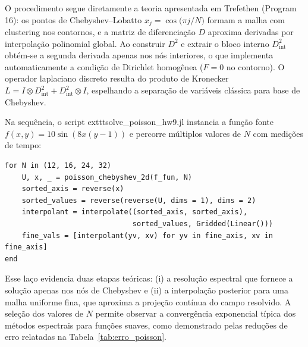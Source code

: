 O procedimento segue diretamente a teoria apresentada em Trefethen (Program 16): os pontos de Chebyshev--Lobatto $x_j = \cos\big(\pi j/N\big)$ formam a malha com clustering nos contornos, e a matriz de diferenciação $D$ aproxima derivadas por interpolação polinomial global. Ao construir $D^2$ e extrair o bloco interno $D_{\text{int}}^2$ obtém-se a segunda derivada apenas nos nós interiores, o que implementa automaticamente a condição de Dirichlet homogênea ($F=0$ no contorno). O operador laplaciano discreto resulta do produto de Kronecker $L = I \otimes D_{\text{int}}^2 + D_{\text{int}}^2 \otimes I$, espelhando a separação de variáveis clássica para base de Chebyshev.

Na sequência, o script 	exttt{solve\_poisson\_hw9.jl} instancia a função fonte $f(x,y) = 10\sin(8x(y-1))$ e percorre múltiplos valores de $N$ com medições de tempo:

\begin{verbatim}
for N in (12, 16, 24, 32)
    U, x, _ = poisson_chebyshev_2d(f_fun, N)
    sorted_axis = reverse(x)
    sorted_values = reverse(reverse(U, dims = 1), dims = 2)
    interpolant = interpolate((sorted_axis, sorted_axis),
                              sorted_values, Gridded(Linear()))
    fine_vals = [interpolant(yv, xv) for yv in fine_axis, xv in fine_axis]
end
\end{verbatim}

Esse laço evidencia duas etapas teóricas: (i) a resolução espectral que fornece a solução apenas nos nós de Chebyshev e (ii) a interpolação posterior para uma malha uniforme fina, que aproxima a projeção contínua do campo resolvido. A seleção dos valores de $N$ permite observar a convergência exponencial típica dos métodos espectrais para funções suaves, como demonstrado pelas reduções de erro relatadas na Tabela~\ref{tab:erro_poisson}.
